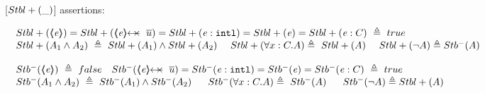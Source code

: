  \begin{definition}
\label{def:Pos}
[${Stbl+( \_ )}$] assertions: %

$
\begin{array}{l}
 \begin{array}{l}
  \Pos {\inside{\re}} =  \Pos {\protectedFrom \re {\overline {u}}} =  
  \Pos  {\internal \re} =   
    \Pos {\re}=   
     \Pos {\re:C}\   \triangleq \    true
 \end{array}
  \\
 \begin{array}{lll}
 \Pos  {A_1  \wedge  A_2}\  \triangleq\     \Pos  { A_1}  \wedge    \Pos  {A_2}   \  &
      
 \Pos  {\forall x:C.A}   \triangleq\   \Pos A
\   &
  \Pos {\neg A}  \triangleq \Neg A
 \end{array}
 \\
 \\
  \begin{array}{ll}
  \Neg {\inside{\re}}\  \triangleq \    false &    \Neg {\protectedFrom \re {\overline {u}}} =  
  \Neg  {\internal \re} =   
    \Neg {\re}=   
     \Neg {\re:C}\   \triangleq \    true
 \end{array}
  \\
 \begin{array}{lll}
 \Neg  {A_1  \wedge  A_2}\  \triangleq\     \Neg  { A_1}  \wedge    \Neg  {A_2}   \ \   
 &    
 \Neg  {\forall x:C.A}   \triangleq\   \Neg A \ \ 
&
  \Neg {\neg A}  \triangleq \Pos A
 \end{array}

 \end{array}
$
\label{f:Pos}
\end{definition}